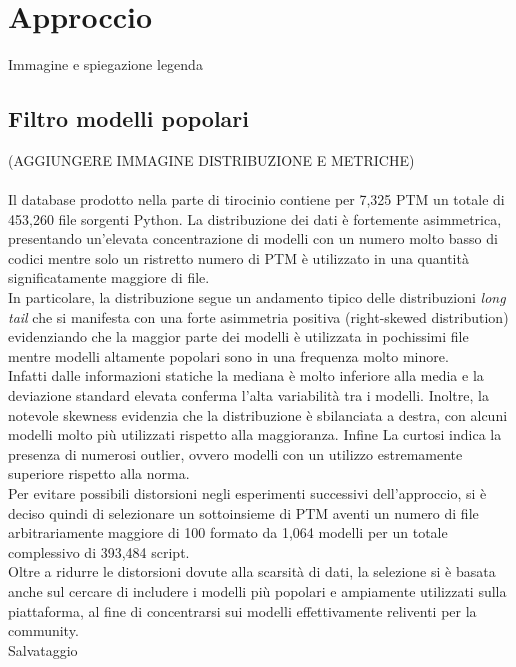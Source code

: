\documentclass{article}
\begin{document}
\section{Approccio}
Immagine e spiegazione legenda 


\subsection{Filtro modelli popolari}
(AGGIUNGERE IMMAGINE DISTRIBUZIONE E METRICHE)\\
\\
Il database prodotto nella parte di tirocinio contiene per 7,325 PTM un totale di 453,260 file sorgenti Python. La distribuzione dei dati è fortemente asimmetrica, presentando un'elevata concentrazione di modelli con un numero molto basso di codici mentre solo un ristretto numero di PTM è utilizzato in una quantità significatamente maggiore di file.\\
In particolare, la distribuzione segue un andamento tipico delle distribuzioni \textit{long tail} che si manifesta con una forte asimmetria positiva (right-skewed distribution) evidenziando che la maggior parte dei modelli è utilizzata in pochissimi file mentre modelli altamente popolari sono in una frequenza molto minore.\\
Infatti dalle informazioni statiche la mediana è molto inferiore alla media e la deviazione standard elevata conferma l'alta variabilità tra i modelli. Inoltre, la notevole skewness evidenzia che la distribuzione è sbilanciata a destra, con alcuni modelli molto più utilizzati rispetto alla maggioranza. Infine La curtosi indica la presenza di numerosi outlier, ovvero modelli con un utilizzo estremamente superiore rispetto alla norma.\\
Per evitare possibili distorsioni negli esperimenti successivi dell'approccio, si è deciso quindi di selezionare un sottoinsieme di PTM aventi un numero di file arbitrariamente maggiore di 100 formato da 1,064 modelli per un totale complessivo di 393,484 script.\\
Oltre a ridurre le distorsioni dovute alla scarsità di dati, la selezione si è basata anche sul cercare di includere i modelli più popolari e ampiamente utilizzati sulla piattaforma, al fine di concentrarsi sui modelli effettivamente reliventi per la community.\\
Salvataggio
\end{document}

